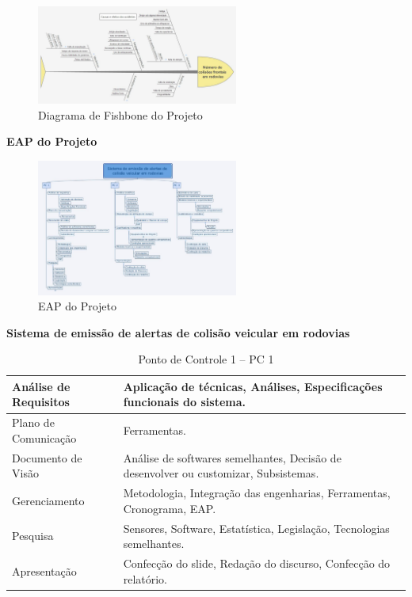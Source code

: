 \begin{figure}[h!]
\centering
\includegraphics[width=250px, scale=1]{figuras/fishbone}
\caption{Diagrama de Fishbone do Projeto}
\label{fig:fishbone}
\end{figure}


\textbf{EAP do Projeto}
\begin{figure}[h!]
\centering
\includegraphics[width=250px, scale=1]{figuras/neweap}
\caption{EAP do Projeto}
\label{fig:neweap}
\end{figure}

\textbf{Sistema de emissão de alertas de colisão veicular em rodovias}
\\

\begin{table}[]
\centering
\caption{Ponto de Controle 1 – PC 1}
\label{custo_equip}
\begin{tabular}{|p{4cm}|p{5cm}|}
  \hline
  Análise de Requisitos & Aplicação de técnicas, Análises, Especificações funcionais do sistema. \\
  \hline
  Plano de Comunicação & Ferramentas. \\
  \hline
  Documento de Visão & Análise de softwares semelhantes, Decisão de desenvolver ou customizar, Subsistemas. \\
  \hline
  Gerenciamento & Metodologia, Integração das engenharias, Ferramentas, Cronograma, EAP. \\
  \hline
  Pesquisa & Sensores, Software, Estatística, Legislação, Tecnologias semelhantes. \\
  \hline
  Apresentação & Confecção do slide, Redação do discurso, Confecção do relatório. \\
  \hline

\end{tabular}
\end{table}



